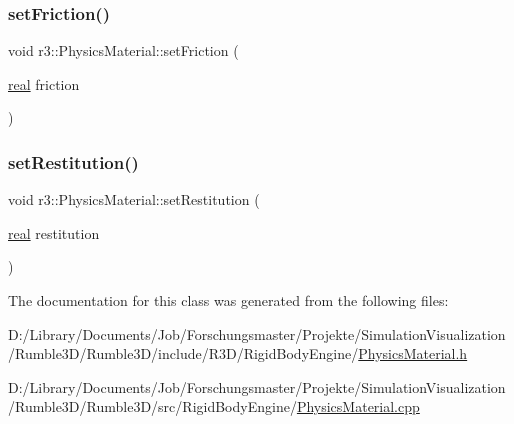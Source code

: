 \mbox{\label{classr3_1_1_physics_material_a8193e719476e1b22ba61b9cd15066437}} 
\subsubsection{\texorpdfstring{set\+Friction()}{setFriction()}}
{\footnotesize\ttfamily void r3\+::\+Physics\+Material\+::set\+Friction (\begin{DoxyParamCaption}\item[{\mbox{\hyperlink{namespacer3_ab2016b3e3f743fb735afce242f0dc1eb}{real}}}]{friction }\end{DoxyParamCaption})}

\mbox{\label{classr3_1_1_physics_material_a2056c195a2d655aefe9a480c28e67ddb}} 
\subsubsection{\texorpdfstring{set\+Restitution()}{setRestitution()}}
{\footnotesize\ttfamily void r3\+::\+Physics\+Material\+::set\+Restitution (\begin{DoxyParamCaption}\item[{\mbox{\hyperlink{namespacer3_ab2016b3e3f743fb735afce242f0dc1eb}{real}}}]{restitution }\end{DoxyParamCaption})}



The documentation for this class was generated from the following files\+:\begin{DoxyCompactItemize}
\item 
D\+:/\+Library/\+Documents/\+Job/\+Forschungsmaster/\+Projekte/\+Simulation\+Visualization/\+Rumble3\+D/\+Rumble3\+D/include/\+R3\+D/\+Rigid\+Body\+Engine/\mbox{\hyperlink{_physics_material_8h}{Physics\+Material.\+h}}\item 
D\+:/\+Library/\+Documents/\+Job/\+Forschungsmaster/\+Projekte/\+Simulation\+Visualization/\+Rumble3\+D/\+Rumble3\+D/src/\+Rigid\+Body\+Engine/\mbox{\hyperlink{_physics_material_8cpp}{Physics\+Material.\+cpp}}\end{DoxyCompactItemize}
